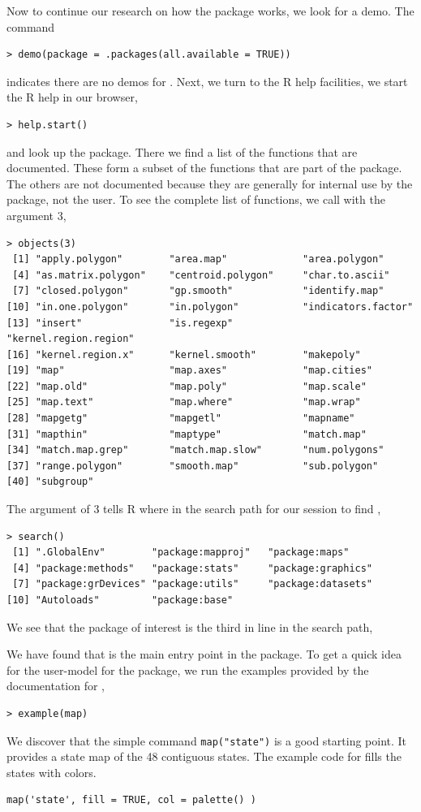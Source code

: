 Now to continue our research on how the package works, we look for a demo.
The command
\begin{verbatim} 
> demo(package = .packages(all.available = TRUE))
\end{verbatim}
indicates there are no demos for .
Next, we turn to the R help facilities, we start the R help in our browser,
\begin{verbatim}
> help.start()
\end{verbatim}
and look up the  package. 
There we find a list of the functions that are documented. 
These  form a subset of the functions that are part of the package. 
The others are not documented because they are generally for internal
use by the package, not the user. 
To see the complete list of functions, 
we call  with the argument $3$, 
\begin{verbatim}
> objects(3)
 [1] "apply.polygon"        "area.map"             "area.polygon"        
 [4] "as.matrix.polygon"    "centroid.polygon"     "char.to.ascii"       
 [7] "closed.polygon"       "gp.smooth"            "identify.map"        
[10] "in.one.polygon"       "in.polygon"           "indicators.factor"   
[13] "insert"               "is.regexp"            "kernel.region.region"
[16] "kernel.region.x"      "kernel.smooth"        "makepoly"            
[19] "map"                  "map.axes"             "map.cities"          
[22] "map.old"              "map.poly"             "map.scale"           
[25] "map.text"             "map.where"            "map.wrap"            
[28] "mapgetg"              "mapgetl"              "mapname"             
[31] "mapthin"              "maptype"              "match.map"           
[34] "match.map.grep"       "match.map.slow"       "num.polygons"        
[37] "range.polygon"        "smooth.map"           "sub.polygon"         
[40] "subgroup"            
\end{verbatim}
The argument of $3$ tells R where in the search path for our session
to find ,
\begin{verbatim}
> search()
 [1] ".GlobalEnv"        "package:mapproj"   "package:maps"     
 [4] "package:methods"   "package:stats"     "package:graphics" 
 [7] "package:grDevices" "package:utils"     "package:datasets" 
[10] "Autoloads"         "package:base"     
\end{verbatim}
We see that the package of interest is the third in line in the search path,

We have found that  is the main entry
point in the package. To get a quick idea for the user-model for
the package, we run the examples provided by the documentation for
,
\begin{verbatim}
> example(map)
\end{verbatim}
We discover that the simple command \verb+map("state")+ is a 
good starting point.
It provides a state map of the 48 contiguous states.
The example code for  fills the states with
colors.
\begin{verbatim}
map('state', fill = TRUE, col = palette() )
\end{verbatim}

